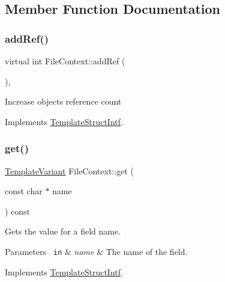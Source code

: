 \subsection{Member Function Documentation}
\mbox{\label{class_file_context_a4de39e9e60907cd5d245997c45e7f29f}} 
\subsubsection{\texorpdfstring{addRef()}{addRef()}}
{\footnotesize\ttfamily virtual int File\+Context\+::add\+Ref (\begin{DoxyParamCaption}{ }\end{DoxyParamCaption})\hspace{0.3cm}{\ttfamily [inline]}, {\ttfamily [virtual]}}

Increase object\textquotesingle{}s reference count 

Implements \mbox{\hyperlink{class_template_struct_intf_a05fe97ad47633beb326f69686faed581}{Template\+Struct\+Intf}}.

\mbox{\label{class_file_context_a75e1e5c1d07c7d5b19e798fae742395e}} 
\subsubsection{\texorpdfstring{get()}{get()}}
{\footnotesize\ttfamily \mbox{\hyperlink{class_template_variant}{Template\+Variant}} File\+Context\+::get (\begin{DoxyParamCaption}\item[{const char $\ast$}]{name }\end{DoxyParamCaption}) const\hspace{0.3cm}{\ttfamily [virtual]}}

Gets the value for a field name. 
\begin{DoxyParams}[1]{Parameters}
\mbox{\texttt{ in}}  & {\em name} & The name of the field. \\
\hline
\end{DoxyParams}


Implements \mbox{\hyperlink{class_template_struct_intf_a3d610cb81b4adbb531ebed3aa3d09b51}{Template\+Struct\+Intf}}.

\mbox{\label{class_file_context_a76d76875d88990fae2a58b92e4fd97e0}} 
